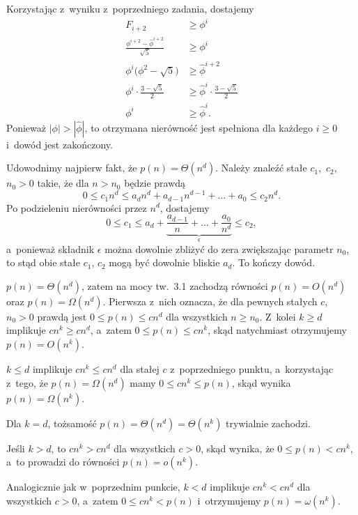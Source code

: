 \exercise{} %
Korzystając z~wyniku z~poprzedniego zadania, dostajemy
\begin{align*}
	F_{i+2} &\ge \phi^i \\
	\frac{\phi^{i+2}-\widehat\phi^{i+2}}{\sqrt{5}} &\ge \phi^i \\
	\phi^i\bigl(\phi^2-\sqrt{5}\bigr) &\ge \widehat\phi^{i+2} \\
	\phi^i\cdot\frac{3-\sqrt{5}}{2} &\ge \widehat\phi^i\cdot\frac{3-\sqrt{5}}{2} \\
	\phi^i &\ge \widehat\phi^i.
\end{align*}
Ponieważ $|\phi|>|\widehat\phi|$, to otrzymana nierówność jest spełniona dla każdego $i\ge0$ i~dowód jest zakończony.

\problems

Udowodnimy najpierw fakt, że $p(n)=\Theta(n^d)$. Należy znaleźć stałe $c_1$,~$c_2$,~$n_0>0$ takie, że dla $n>n_0$ będzie prawdą
\[
	0 \le c_1n^d \le a_dn^d+a_{d-1}n^{d-1}+\dots+a_0 \le c_2n^d.
\]
Po podzieleniu nierówności przez $n^d$, dostajemy
\[
	0 \le c_1 \le a_d+\underbrace{\frac{a_{d-1}}{n}+\dots+\frac{a_0}{n^d}}_\epsilon \le c_2,
\]
a~ponieważ składnik $\epsilon$ można dowolnie zbliżyć do zera zwiększając parametr $n_0$, to stąd obie stałe $c_1$, $c_2$ mogą być dowolnie bliskie $a_d$. To kończy dowód.

\subexercise{} %
$p(n)=\Theta(n^d)$, zatem na mocy tw.~3.1 zachodzą równości $p(n)=O(n^d)$ oraz $p(n)=\Omega(n^d)$. Pierwsza z~nich oznacza, że dla pewnych stałych $c$,~$n_0>0$ prawdą jest $0\le p(n)\le cn^d$ dla wszystkich $n\ge n_0$. Z~kolei $k\ge d$ implikuje $cn^k\ge cn^d$, a~zatem $0\le p(n)\le cn^k$, skąd natychmiast otrzymujemy $p(n)=O(n^k)$.

\subexercise{} %
$k\le d$ implikuje $cn^k\le cn^d$ dla stałej $c$ z~poprzedniego punktu, a~korzystając z~tego, że $p(n)=\Omega(n^d)$ mamy $0\le cn^k\le p(n)$, skąd wynika $p(n)=\Omega(n^k)$.

\subexercise{} %
Dla $k=d$, tożsamość $p(n)=\Theta(n^d)=\Theta(n^k)$ trywialnie zachodzi.

\subexercise{} %
Jeśli $k>d$, to $cn^k>cn^d$ dla wszystkich $c>0$, skąd wynika, że $0\le p(n)<cn^k$, a~to prowadzi do równości $p(n)=o(n^k)$.

\subexercise{} %
Analogicznie jak w~poprzednim punkcie, $k<d$ implikuje $cn^k<cn^d$ dla wszystkich $c>0$, a~zatem $0\le cn^k<p(n)$ i~otrzymujemy $p(n)=\omega(n^k)$.


